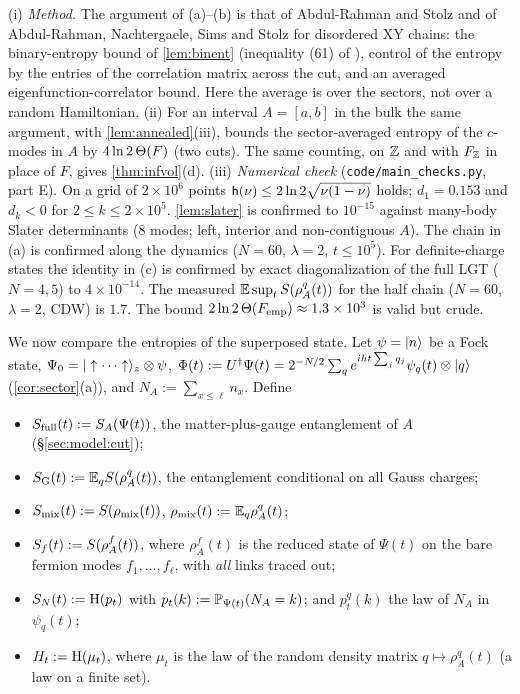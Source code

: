 \begin{remark}\label{rem:main-arealaw}
(i) \emph{Method.}  The argument of (a)--(b) is that of Abdul-Rahman and Stolz \cite{AbdulRahmanStolz2015} and of
Abdul-Rahman, Nachtergaele, Sims and Stolz \cite[proof of Thm.~1.2]{ANSS2016} for disordered XY chains: the
binary-entropy bound of \cref{lem:binent} (inequality (61) of \cite{ANSS2016}), control of the entropy by the
entries of the correlation matrix across the cut, and an averaged eigenfunction-correlator bound.  Here the
average is over the sectors, not over a random Hamiltonian.
(ii) For an interval $A=[a,b]$ in the bulk the same argument, with \cref{lem:annealed}(iii), bounds the
sector-averaged entropy of the $c$-modes in $A$ by $4\ln2\,\Theta(F)$ (two cuts).  The same counting, on $\mathbb{Z}$ and with
$F_{\mathbb{Z}}$ in place of $F$, gives \cref{thm:infvol}(d).
(iii) \emph{Numerical check} (\texttt{code/main\_checks.py}, part E).  On a grid of $2\times10^6$ points
$\mathsf{h}(\nu)\le2\ln2\sqrt{\nu(1-\nu)}$ holds; $d_1=0.153$ and $d_k<0$ for $2\le k\le2\times10^5$.
\cref{lem:slater} is confirmed to $10^{-15}$ against many-body Slater determinants ($8$ modes; left, interior and
non-contiguous $A$).  The chain in (a) is confirmed along the dynamics ($N=60$, $\lambda=2$, $t\le10^5$).
For definite-charge states the identity in (c) is confirmed by exact diagonalization of the full LGT ($N=4,5$)
to $4\times10^{-14}$.  The measured $\mathbb{E}\sup_tS(\rho^q_A(t))$ for the half chain ($N=60$, $\lambda=2$, CDW) is
$1.7$.  The bound $2\ln2\,\Theta(F_{\rm emp})\approx1.3\times10^3$ is valid but crude.
\end{remark}

We now compare the entropies of the superposed state.  Let $\psi=|n\rangle$ be a Fock state,
$\Psi_0=|\uparrow\cdots\uparrow\rangle_z\otimes\psi$, $\Phi(t):=U^\dagger\Psi(t)=2^{-N/2}\sum_qe^{iht\sum_jq_j}\psi_q(t)\otimes|q\rangle$
(\cref{cor:sector}(a)), and $N_A:=\sum_{x\le\ell}n_x$.  Define
\begin{itemize}
\item $S_{\mathrm{full}}(t):=S_A(\Psi(t))$, the matter-plus-gauge entanglement of $A$ (\S\ref{sec:model:cut});
\item $S_{\mathrm{G}}(t):=\mathbb{E}_qS(\rho^q_A(t))$, the entanglement conditional on all Gauss charges;
\item $S_{\mathrm{mix}}(t):=S(\rho_{\rm mix}(t))$, $\rho_{\rm mix}(t):=\mathbb{E}_q\rho^q_A(t)$;
\item $S_{f}(t):=S(\rho^f_A(t))$, where $\rho^f_A(t)$ is the reduced state of $\Psi(t)$ on the bare fermion modes
$f_1,\dots,f_\ell$, with \emph{all} links traced out;
\item $S_{N}(t):=\mathrm{H}(p_t)$ with $p_t(k):=\mathbb{P}_{\Psi(t)}(N_A=k)$; and $p^q_t(k)$ the law of $N_A$ in $\psi_q(t)$;
\item $H_t:=\mathrm{H}(\mu_t)$, where $\mu_t$ is the law of the random density matrix $q\mapsto\rho^q_A(t)$ (a law on a finite
set).
\end{itemize}

